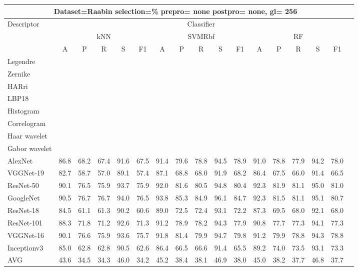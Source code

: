 \documentclass[12pt,italian]{article}
\begin{document}
\begin{tiny}
 \pagebreak 
\begin{longtable}{lcccccccccccccccc}
\toprule
\multicolumn{16}{c}{Dataset=Raabin selection=\% prepro= none postpro= none, gl= 256} \\ 
\toprule
Descriptor & \multicolumn{15}{c}{Classifier} \\ 
& \multicolumn{5}{c}{kNN} & \multicolumn{5}{c}{SVMRbf} & \multicolumn{5}{c}{RF} \\ 
& A & P & R & S & F1 & A & P & R & S & F1 & A & P & R & S & F1 \\ 
\midrule
Legendre \\ 
Zernike \\ 
HARri \\ 
LBP18 \\ 
Histogram \\ 
Correlogram \\ 
Haar wavelet \\ 
Gabor wavelet \\ 
AlexNet & 86.8 & 68.2 & 67.4 & 91.6 & 67.5 & 91.4 & 79.6 & 78.8 & 94.5 & 78.9 & 91.0 & 78.8 & 77.9 & 94.2 & 78.0 \\ 
VGGNet-19 & 82.7 & 58.7 & 57.0 & 89.1 & 57.4 & 87.1 & 68.8 & 68.0 & 91.9 & 68.2 & 86.4 & 67.5 & 66.0 & 91.4 & 66.5 \\ 
ResNet-50 & 90.1 & 76.5 & 75.9 & 93.7 & 75.9 & 92.0 & 81.6 & 80.5 & 94.8 & 80.4 & 92.3 & 81.9 & 81.1 & 95.0 & 81.0 \\ 
GoogleNet & 90.5 & 76.7 & 76.7 & 94.0 & 76.5 & 93.8 & 85.3 & 84.9 & 96.1 & 84.7 & 92.3 & 81.5 & 81.1 & 95.1 & 80.7 \\ 
ResNet-18 & 84.5 & 61.1 & 61.3 & 90.2 & 60.6 & 89.0 & 72.5 & 72.4 & 93.1 & 72.2 & 87.3 & 69.5 & 68.0 & 92.1 & 68.0 \\ 
ResNet-101 & 88.3 & 71.8 & 71.2 & 92.6 & 71.3 & 91.2 & 78.9 & 78.2 & 94.3 & 77.9 & 90.8 & 77.7 & 77.3 & 94.1 & 77.3 \\ 
VGGNet-16 & 90.1 & 76.6 & 75.9 & 93.6 & 75.7 & 91.8 & 81.4 & 79.9 & 94.7 & 79.8 & 91.2 & 79.9 & 78.8 & 94.3 & 78.8 \\ 
Inceptionv3 & 85.0 & 62.8 & 62.8 & 90.5 & 62.6 & 86.4 & 66.5 & 66.6 & 91.4 & 65.5 & 89.2 & 74.0 & 73.5 & 93.1 & 73.3 \\ 
\hline
AVG & 43.6 & 34.5 & 34.3 & 46.0 & 34.2 & 45.2 & 38.4 & 38.1 & 46.9 & 38.0 & 45.0 & 38.2 & 37.7 & 46.8 & 37.7 \\ 
\hline
\bottomrule
\end{longtable} 

 \pagebreak 
\end{tiny} 
 
\end{document}
